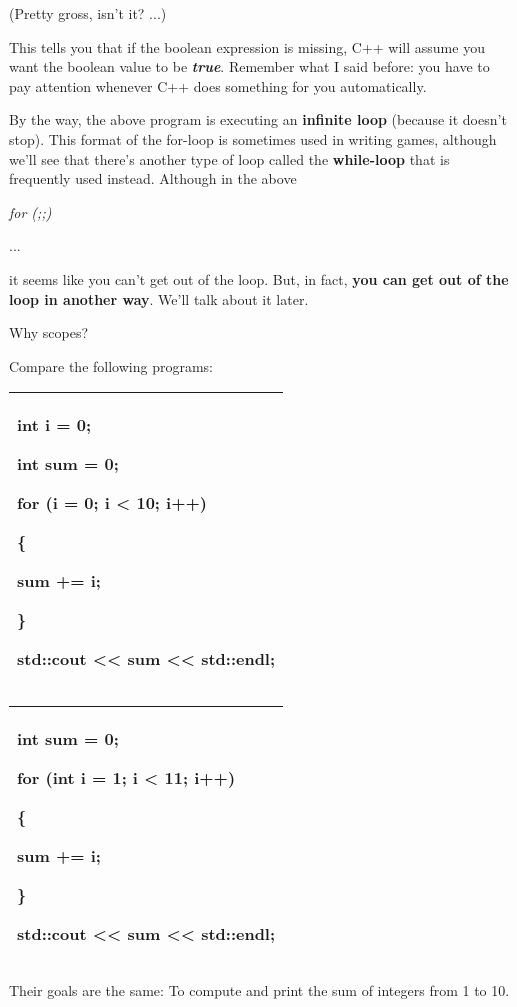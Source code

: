 \documentclass[
]{article}
\begin{document}
(Pretty gross, isn't it? ...)

This tells you that if the boolean expression is missing, C++ will
assume you want the boolean value to be \emph{\textbf{true}}. Remember
what I said before: you have to pay attention whenever C++ does
something for you automatically.

By the way, the above program is executing an \textbf{infinite loop}
(because it doesn't stop). This format of the for-loop is sometimes used
in writing games, although we'll see that there's another type of loop
called the \textbf{while-loop} that is frequently used instead. Although
in the above

\emph{for (;;)}

...

it seems like you can't get out of the loop. But, in fact, \textbf{you
can get out of the loop in another way}. We'll talk about it later.

Why scopes?

Compare the following programs:

\begin{longtable}[]{@{}l@{}}
\toprule
\endhead
\begin{minipage}[t]{0.97\columnwidth}\raggedright
int i = 0;

int sum = 0;

for (i = 0; i \textless{} 10; i++)

\{

sum += i;

\}

std::cout \textless\textless{} sum \textless\textless{} std::endl;\strut
\end{minipage}\tabularnewline
\bottomrule
\end{longtable}

\begin{longtable}[]{@{}l@{}}
\toprule
\endhead
\begin{minipage}[t]{0.97\columnwidth}\raggedright
int sum = 0;

for (int i = 1; i \textless{} 11; i++)

\{

sum += i;

\}

std::cout \textless\textless{} sum \textless\textless{} std::endl;\strut
\end{minipage}\tabularnewline
\bottomrule
\end{longtable}

Their goals are the same: To compute and print the sum of integers from
1 to 10.
\end{document}
